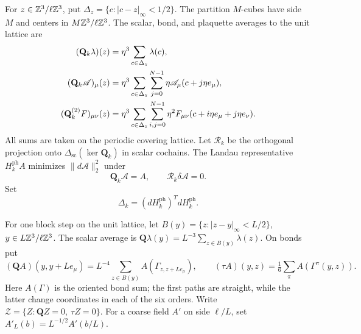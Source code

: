 For \(z\in\mathbb Z^3/\ell\mathbb Z^3\), put
\(\Delta_z=\{c:|c-z|_\infty<1/2\}\).
The partition \(M\)-cubes have side \(M\) and centers in
\(M\mathbb Z^3/\ell\mathbb Z^3\).
The scalar, bond, and plaquette averages to the unit lattice are
\begin{align}
 (\mathbf Q_k\lambda)(z)
   &=\eta^3\sum_{c\in\Delta_z}\lambda(c),\notag\\
 (\mathbf Q_k\mathscr A)_\mu(z)
   &=\eta^3\sum_{c\in\Delta_z}\sum_{j=0}^{N-1}
          \eta\mathscr A_\mu(c+j\eta e_\mu),\label{eq:photon-block-averages}\\
 (\mathbf Q_k^{(2)}F)_{\mu\nu}(z)
   &=\eta^3\sum_{c\in\Delta_z}\sum_{i,j=0}^{N-1}
          \eta^2F_{\mu\nu}(c+i\eta e_\mu+j\eta e_\nu).\notag
\end{align}
All sums are taken on the periodic covering lattice.
Let \(\mathcal R_k\) be the orthogonal projection onto
\(\Delta_{\mathrm{sc}}(\ker\mathbf Q_k)\) in scalar cochains.
The Landau representative \(H_k^{\mathrm{ph}}A\) minimizes
\(\|d\mathscr A\|_2^2\) under
\begin{equation}\label{eq:photon-Landau-constraints}
 \mathbf Q_k\mathscr A=A,\qquad \mathcal R_k\delta\mathscr A=0.
\end{equation}
Set
\begin{equation}\label{eq:photon-coarse-form}
 \Delta_k=(dH_k^{\mathrm{ph}})^TdH_k^{\mathrm{ph}}.
\end{equation}

For one block step on the unit lattice, let
\(B(y)=\{z:|z-y|_\infty<L/2\}\), \(y\in L\mathbb Z^3/\ell\mathbb Z^3\).
The scalar average is
\(\mathbf Q\lambda(y)=L^{-3}\sum_{z\in B(y)}\lambda(z)\).
On bonds put
\[
 (\mathbf QA)(y,y+Le_\mu)
   =L^{-4}\sum_{z\in B(y)}A(\Gamma_{z,z+Le_\mu}),\qquad
 (\tau A)(y,z)=\tfrac16\sum_\pi A(\Gamma^\pi(y,z)).
\]
Here \(A(\Gamma)\) is the oriented bond sum; the first paths are
straight, while the latter change coordinates in each of the six
orders. Write \(\mathcal Z=\{Z:\mathbf QZ=0,\ \tau Z=0\}\).
For a coarse field \(A'\) on side \(\ell/L\), set
\(A'_L(b)=L^{-1/2}A'(b/L)\).

